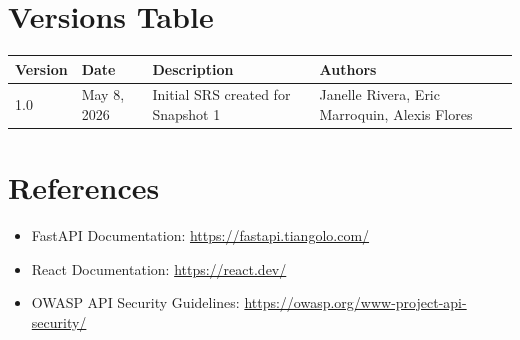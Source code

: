 \documentclass[12pt]{article}
\begin{document}
\section{Versions Table}

\begin{longtable}{|p{2cm}|p{2.5cm}|p{5cm}|p{4cm}|}
\hline
\textbf{Version} & \textbf{Date} & \textbf{Description} & \textbf{Authors} \\
\hline
1.0 & May 8, 2026 & Initial SRS created for Snapshot 1 & Janelle Rivera, Eric Marroquin, Alexis Flores \\
\hline
\end{longtable}

\section{References}

\begin{itemize}
    \item FastAPI Documentation: \url{https://fastapi.tiangolo.com/}
    \item React Documentation: \url{https://react.dev/}
    \item OWASP API Security Guidelines: \url{https://owasp.org/www-project-api-security/}
\end{itemize}
\end{document}
